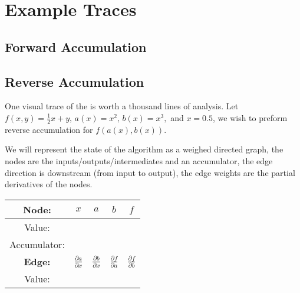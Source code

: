 \section{Example Traces}
\subsection{Forward Accumulation}
\subsection{Reverse Accumulation}
One visual trace of the is worth a thousand lines of analysis.
Let $f(x,y) = \frac{1}{2}x+y,\,a(x)=x^2,\,b(x)=x^3,$ and $x=0.5$, 
we wish to preform reverse accumulation for $f(a(x),b(x))$.

We will represent the state of the algorithm as a weighed directed graph,
the nodes are the inputs/outputs/intermediates and an accumulator,
the edge direction is downstream (from input to output),
the edge weights are the partial derivatives of the nodes.
\begin{multicols}{2}
	\columnbreak
	\centering
	\begin{center}
\begin{tabular}{|c|c|c|c|c|}
	\hline
	\bf Node:\phantom{\bigg|} &$x$&$a$&$b$&$f$\\
	\hline
	Value: &&&&\\
	Accumulator: &&&&\\
	\hline
	\hline
	\bf Edge:\phantom{\bigg|} &$\frac{\partial a}{\partial x}$&$\frac{\partial b}{\partial x}$&$\frac{\partial f}{\partial a}$&$\frac{\partial f}{\partial b}$\\
	\hline
	Value: &&&&\\
	\hline
\end{tabular}
	\end{center}
\end{multicols}

